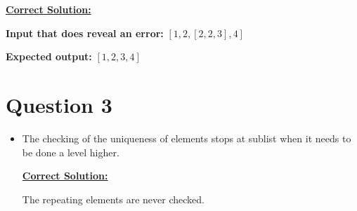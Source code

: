 \documentclass[12pt]{article}
\begin{document}
\begin{enumerate}[a.]
    \bigskip

    \begin{mdframed}

    \underline{\textbf{Correct Solution:}}

    \bigskip

    \textbf{Input that does reveal an error:} $[1,2,[2,2,3],4]$

    \bigskip

    \textbf{Expected output:} $[1,2,3,4]$

    \bigskip


    \end{mdframed}
\end{enumerate}

\section*{Question 3}
\begin{itemize}
    \item
    The checking of the uniqueness of elements stops at sublist when it needs
    to be done a level higher.

    \begin{mdframed}

    \underline{\textbf{Correct Solution:}}

    \bigskip

    \color{red}The repeating elements are never checked.\color{black}

    \end{mdframed}
\end{itemize}
\end{document}
